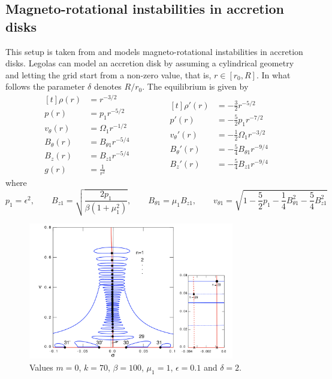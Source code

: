 \documentclass[12pt]{article}
\begin{document}
\newpage
\subsection{Magneto-rotational instabilities in accretion disks}
This setup is taken from \citet{goedbloed2018} and models magneto-rotational instabilities in accretion disks. Legolas can model an accretion disk by assuming a cylindrical geometry and letting the grid start from a non-zero value, that is, $r \in [r_0, R]$.
In what follows the parameter $\delta$ denotes $R / r_0$. The equilibrium is given by
\begin{equation*}
	\begin{aligned}[t]
		\rho(r) &= r^{-3/2} \\
		p(r) &= p_1r^{-5/2} \\
		v_\theta(r) &= \Omega_1 r^{-1/2} \\
		B_\theta(r) &= B_{\theta 1}r^{-5/4} \\
		B_z(r) &= B_{z1}r^{-5/4} \\
		g(r) &= \frac{1}{r^2}
	\end{aligned}
	\qquad\qquad
	\begin{aligned}[t]
		\rho'(r) &= -\frac{3}{2}r^{-5/2} \\
		p'(r) &= -\frac{5}{2}p_1 r^{-7/2} \\
		v_\theta'(r) &= -\frac{1}{2}\Omega_1 r^{-3/2} \\
		B_\theta'(r) &= -\frac{5}{4}B_{\theta 1}r^{-9/4} \\
		B_z'(r) &= -\frac{5}{4}B_{z1}r^{-9/4}
	\end{aligned}
\end{equation*}
where
\[ p_1 = \epsilon^2, \qquad B_{z1} = \sqrt{\frac{2p_1}{\beta(1 + \mu_1^2)}}, \qquad B_{\theta 1} = \mu_1 B_{z1}, \qquad v_{\theta 1} = \sqrt{1 - \frac{5}{2}p_1 - \frac{1}{4}B_{\theta 1}^2 - \frac{5}{4}B_{z1}^2} \]

\begin{figure}[h]
	\centering
	\includegraphics[width=0.8\textwidth]{accretion_disk.png}
	\caption{Values $m = 0$, $k = 70$, $\beta = 100$, $\mu_1 = 1$, $\epsilon = 0.1$ and $\delta = 2$.}
\end{figure}
\end{document}
